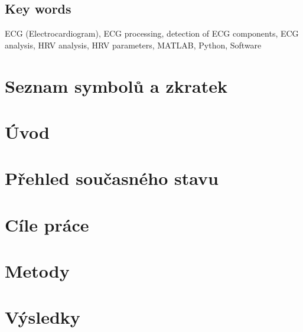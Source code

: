\documentclass[a4paper,12pt,czech]{article}   %
\numberwithin{equation}{section}        %
\begin{document}
\subsection*{Key words}
ECG (Electrocardiogram), ECG processing, detection of ECG components, ECG analysis, HRV analysis, HRV parameters, MATLAB, Python, Software
\clearpage

\pagestyle{plain}	%

\tableofcontents			%

\clearpage

\section*{Seznam symbolů a zkratek} %

\clearpage






\section{Úvod}

\clearpage

\section{Přehled současného stavu}

\clearpage

\section{Cíle práce}
\label{section:thesis_aims}

\clearpage

\section{Metody}

\clearpage

\section{Výsledky}

\clearpage
\end{document}
